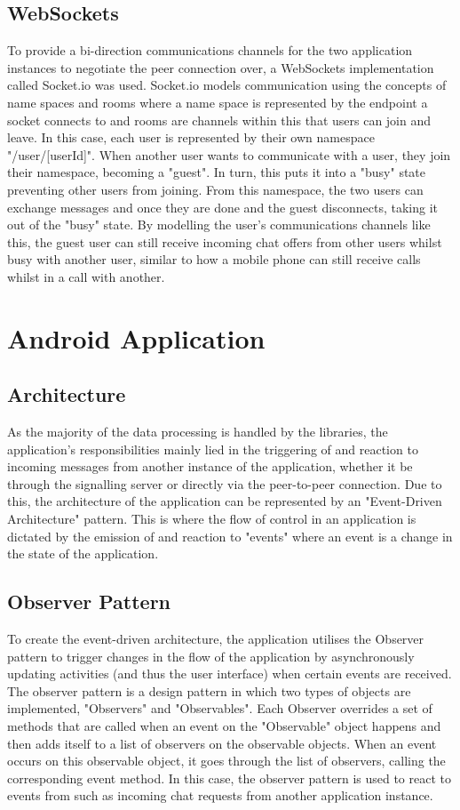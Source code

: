 \documentclass[]{report}
\begin{document}
			\subsection{WebSockets}
			To provide a bi-direction communications channels for the two application instances to negotiate the peer connection over, a WebSockets implementation called Socket.io was used. Socket.io models communication using the concepts of name spaces and rooms where a name space is represented by the endpoint a socket connects to and rooms are channels within this that users can join and leave. In this case, each user is represented by their own namespace "/user/[userId]". When another user wants to communicate with a user, they join their namespace, becoming a "guest". In turn, this puts it into a "busy" state preventing other users from joining. From this namespace, the two users can exchange messages and once they are done and the guest disconnects, taking it out of the "busy" state. By modelling the user's communications channels like this, the guest user can still receive incoming chat offers from other users whilst busy with another user, similar to how a mobile phone can still receive calls whilst in a call with another. 
			
		\section{Android Application}
			
			\subsection{Architecture}
			As the majority of the data processing is handled by the libraries, the application's responsibilities mainly lied in the triggering of and reaction to incoming messages from another instance of the application, whether it be through the signalling server or directly via the peer-to-peer connection. Due to this, the architecture of the application can be represented by an "Event-Driven Architecture" pattern. This is where the flow of control in an application is dictated by the emission of and reaction to "events" where an event is a change in the state of the application. 
			
			\subsection{Observer Pattern}
			To create the event-driven architecture, the application utilises the Observer pattern to trigger changes in the flow of the application by asynchronously updating activities (and thus the user interface) when certain events are received. The observer pattern is a design pattern in which two types of objects are implemented, "Observers" and "Observables". Each Observer overrides a set of methods that are called when an event on the "Observable" object happens and then adds itself to a list of observers on the observable objects. When an event occurs on this observable object, it goes through the list of observers, calling the corresponding event method. In this case, the observer pattern is used to react to events from such as incoming chat requests from another application instance.
			
\end{document}

